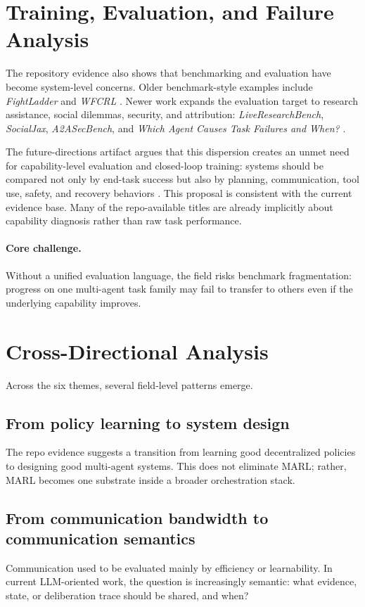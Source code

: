 \documentclass[11pt]{article}
\begin{document}
\section{Training, Evaluation, and Failure Analysis}
The repository evidence also shows that benchmarking and evaluation have become system-level concerns. Older benchmark-style examples include \emph{FightLadder} and \emph{WFCRL} \cite{icml_list,neurips_list}. Newer work expands the evaluation target to research assistance, social dilemmas, security, and attribution: \emph{LiveResearchBench}, \emph{SocialJax}, \emph{A2ASecBench}, and \emph{Which Agent Causes Task Failures and When?} \cite{iclr_subset,icml_list,neurips_list}.

The future-directions artifact argues that this dispersion creates an unmet need for capability-level evaluation and closed-loop training: systems should be compared not only by end-task success but also by planning, communication, tool use, safety, and recovery behaviors \cite{future_directions}. This proposal is consistent with the current evidence base. Many of the repo-available titles are already implicitly about capability diagnosis rather than raw task performance.

\paragraph{Core challenge.}
Without a unified evaluation language, the field risks benchmark fragmentation: progress on one multi-agent task family may fail to transfer to others even if the underlying capability improves.

\section{Cross-Directional Analysis}
Across the six themes, several field-level patterns emerge.

\subsection{From policy learning to system design}
The repo evidence suggests a transition from learning good decentralized policies to designing good multi-agent systems. This does not eliminate MARL; rather, MARL becomes one substrate inside a broader orchestration stack.

\subsection{From communication bandwidth to communication semantics}
Communication used to be evaluated mainly by efficiency or learnability. In current LLM-oriented work, the question is increasingly semantic: what evidence, state, or deliberation trace should be shared, and when?
\end{document}
